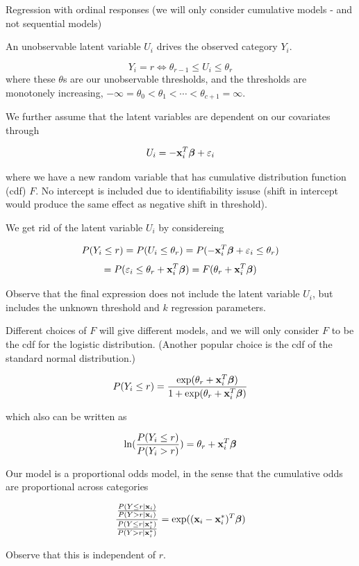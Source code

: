 \documentclass[
  ignorenonframetext,
]{beamer}
\begin{document}
\begin{frame}{Regression with ordinal responses}
\label{regression-with-ordinal-responses}
(we will only consider cumulative models - and not sequential models)

An unobservable latent variable \(U_i\) drives the observed category
\(Y_i\).

\[ Y_i=r \Leftrightarrow \theta_{r-1}\le U_i \le \theta_r\] where these
\(\theta\)s are our unobservable thresholds, and the thresholds are
monotonely increasing,
\(-\infty=\theta_0< \theta_1 < \cdots < \theta_{c+1}=\infty\).

We further assume that the latent variables are dependent on our
covariates through

\[ U_i=-{\bf x}_i^T{\boldsymbol \beta} + \varepsilon_i\]

where we have a new random variable that has cumulative distribution
function (cdf) \(F\). No intercept is included due to identifiability
issuse (shift in intercept would produce the same effect as negative
shift in threshold).
\end{frame}

\begin{frame}
We get rid of the latent variable \(U_i\) by considereing

\[P(Y_i\le r)=P(U_i\le \theta_r)=P(-{\bf x}_i^T {\boldsymbol \beta}+\varepsilon_i \le \theta_r)\]
\[=P(\varepsilon_i \le \theta_r+{\bf x}_i^T {\boldsymbol \beta})=F(\theta_r+{\bf x}_i^T {\boldsymbol \beta}) \]

Observe that the final expression does not include the latent variable
\(U_i\), but includes the unknown threshold and \(k\) regression
parameters.
\end{frame}

\begin{frame}
Different choices of \(F\) will give different models, and we will only
consider \(F\) to be the cdf for the logistic distribution. (Another
popular choice is the cdf of the standard normal distribution.)

\[P(Y_i\le r)=\frac{\exp(\theta_r+{\bf x}_i^T {\boldsymbol \beta})}{1+\exp(\theta_r+{\bf x}_i^T {\boldsymbol \beta})}\]

which also can be written as

\[ \ln(\frac{P(Y_i\le r)}{P(Y_i> r)})=\theta_r+{\bf x}_i^T {\boldsymbol \beta}\]
\end{frame}

\begin{frame}
Our model is a proportional odds model, in the sense that the cumulative
odds are proportional across categories

\[\frac{\frac{P(Y\le r\mid {\bf x}_i)}{P(Y> r\mid {\bf x}_i)}}
{\frac{P(Y\le r\mid {\bf x}^*_i)}{P(Y> r\mid {\bf x}^*_i)}}= \exp(({\bf x}_i-{\bf x}^*_i)^T {\boldsymbol \beta})\]

Observe that this is independent of \(r\).
\end{frame}
\end{document}
